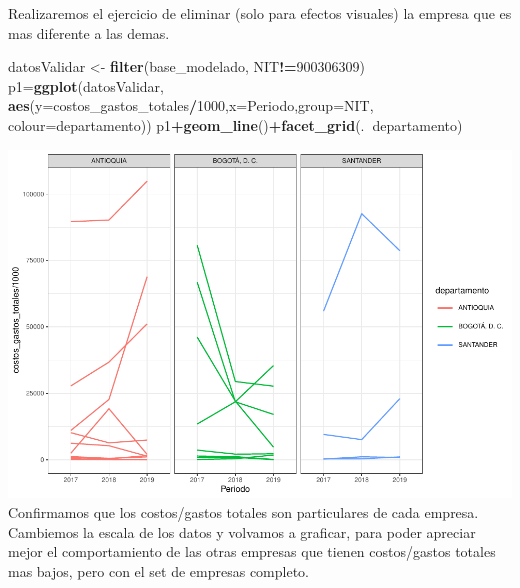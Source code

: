 \documentclass[
  11pt,
  a4paper,
]{book}
\newenvironment{Shaded}{\begin{snugshade}}{\end{snugshade}}
\newcommand{\DataTypeTok}[1]{\textcolor[rgb]{0.13,0.29,0.53}{#1}}
\newcommand{\DecValTok}[1]{\textcolor[rgb]{0.00,0.00,0.81}{#1}}
\newcommand{\KeywordTok}[1]{\textcolor[rgb]{0.13,0.29,0.53}{\textbf{#1}}}
\newcommand{\NormalTok}[1]{#1}
\newcommand{\OperatorTok}[1]{\textcolor[rgb]{0.81,0.36,0.00}{\textbf{#1}}}
\newcommand{\StringTok}[1]{\textcolor[rgb]{0.31,0.60,0.02}{#1}}
\begin{document}
Realizaremos el ejercicio de eliminar (solo para efectos visuales) la
empresa que es mas diferente a las demas.

\begin{Shaded}
\begin{Highlighting}[]
\NormalTok{datosValidar <-}\StringTok{ }\KeywordTok{filter}\NormalTok{(base_modelado, NIT}\OperatorTok{!=}\DecValTok{900306309}\NormalTok{)}
\NormalTok{p1=}\KeywordTok{ggplot}\NormalTok{(datosValidar, }\KeywordTok{aes}\NormalTok{(}\DataTypeTok{y=}\NormalTok{costos_gastos_totales}\OperatorTok{/}\DecValTok{1000}\NormalTok{,}\DataTypeTok{x=}\NormalTok{Periodo,}\DataTypeTok{group=}\NormalTok{NIT,}
                            \DataTypeTok{colour=}\NormalTok{departamento))}
\NormalTok{p1}\OperatorTok{+}\KeywordTok{geom_line}\NormalTok{()}\OperatorTok{+}\KeywordTok{facet_grid}\NormalTok{(.}\OperatorTok{~}\NormalTok{departamento)}
\end{Highlighting}
\end{Shaded}

\includegraphics{index_files/figure-latex/unnamed-chunk-52-1.pdf}
Confirmamos que los costos/gastos totales son particulares de cada
empresa. Cambiemos la escala de los datos y volvamos a graficar, para
poder apreciar mejor el comportamiento de las otras empresas que tienen
costos/gastos totales mas bajos, pero con el set de empresas completo.
\end{document}
